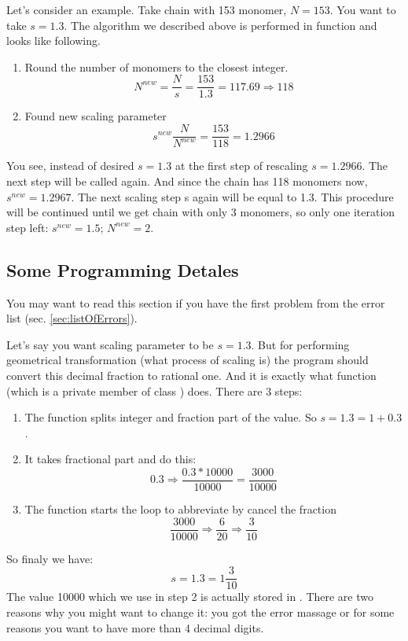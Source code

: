 \documentclass[12pt]{article}
\begin{document}
\begin{mySection}
Let's consider an example. Take chain with 153 monomer, $N=153$. You want to take $s=1.3$. The algorithm we described above is performed in function  and looks like following.
\begin{enumerate}
\item Round the number of monomers to the closest integer.
\begin{equation}
N^{new} = \frac{N}{s} = \frac{153}{1.3} = 117.69\Rightarrow118
\end{equation}
\item Found new scaling parameter
\begin{equation}
s^{new} \frac{N}{N^{new}} = \frac{153}{118} = 1.2966
\end{equation}
\end{enumerate}
You see, instead of desired $s=1.3$ at the first step of rescaling $s=1.2966$. The next step  will be called again. And since the chain has 118 monomers now,  $s^{new}=1.2967$. The next scaling step s again will be equal to 1.3. This procedure will be continued until we get chain with only 3 monomers, so only one iteration step left: $s^{new} = 1.5$; $N^{new} = 2$.

\subsection{Some Programming Detales}\label{sec:scalingParamDetales}
You may want to read this section if you have the first problem from the error list (sec. \ref{sec:listOfErrors}).

Let's say you want scaling parameter to be $s=1.3$. But for performing geometrical transformation (what process of scaling is) the program should convert this decimal fraction to rational one. And it is exactly what function   (which is a private member of class ) does.
There are 3 steps:
\begin{enumerate}
\item The function splits integer and fraction part of the value. So $s = 1.3 = 1+ 0.3$.
\item It takes fractional part and do this:
\begin{equation}
0.3 \Rightarrow \frac{0.3 * 10000}{10000} =\frac{3000}{10000}
\end{equation}
\item The function starts the loop to abbreviate by cancel the fraction 
\begin{equation}
\frac{3000}{10000} \Rightarrow \frac{6}{20}\Rightarrow\frac{3}{10}
\end{equation}
\end{enumerate}
So finaly we have:
\begin{equation}
s=1.3 = 1\frac{3}{10}
\end{equation}
The value 10000 which we use in step 2 is actually stored in . There are two reasons why you might want to change it: you got the error massage or for some reasons you want to have more than 4 decimal digits. 


\end{mySection}
\end{document}
